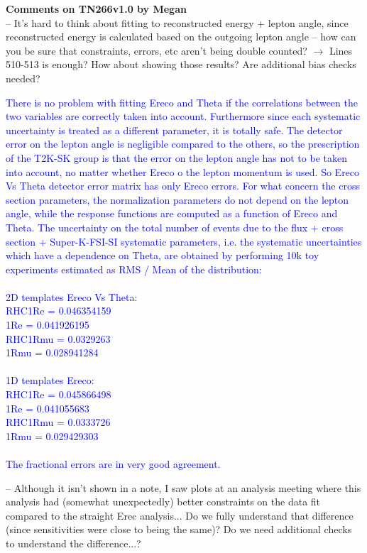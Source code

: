 \documentclass[final]{elsarticle}
\begin{document}
{\Large \textbf{Comments on TN266v1.0 by Megan}} \\

-- It's hard to think about fitting to reconstructed energy + lepton angle,
since reconstructed energy is calculated based on the outgoing lepton angle --
how can you be sure that constraints, errors, etc aren't being double counted?
$\rightarrow$ Lines 510-513 is enough?  How about showing those results?  Are additional
bias checks needed?

\textcolor{blue}{
There is no problem with fitting Ereco and Theta if the correlations between the two variables are correctly taken into account.
Furthermore since each systematic uncertainty is treated as a different parameter, it is totally safe. 
The detector error on the lepton angle is negligible compared to the others,
so the prescription of the T2K-SK group is that the error on the lepton angle has not to be taken into account,
no matter whether Ereco o the lepton momentum is used.
So Ereco Vs Theta detector error matrix has only Ereco errors.
For what concern the cross section parameters, the normalization parameters do not depend on 
the lepton angle, while the response functions are computed as a function of Ereco and Theta.
The uncertainty on the total number of events due to the flux + cross section + Super-K-FSI-SI systematic parameters,
i.e. the systematic uncertainties which have a dependence on Theta,
are obtained by performing 10k toy experiments estimated as RMS / Mean of the distribution:
\\ \\
2D templates Ereco Vs Theta:\\ 
RHC1Re =   0.046354159\\ 
1Re =  0.041926195\\
RHC1Rmu = 0.0329263\\
1Rmu = 0.028941284\\ \\ 
1D templates Ereco: \\
RHC1Re = 0.045866498  \\
1Re =  0.041055683\\
RHC1Rmu = 0.0333726\\
1Rmu = 0.029429303\\
\\
The fractional errors are in very good agreement.
}

-- Although it isn't shown in a note, I saw plots at an analysis meeting where
this analysis had (somewhat unexpectedly) better constraints on the data fit
compared to the straight Erec analysis... Do we fully understand that
difference (since sensitivities were close to being the same)? Do we need
additional checks to understand the difference...?
\end{document}
